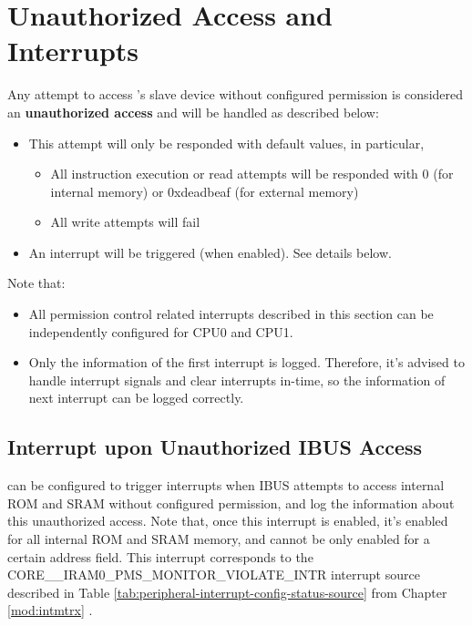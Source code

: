 \documentclass[main\_\_EN.tex]{subfiles}
\begin{document}
\section{Unauthorized Access and Interrupts}

Any attempt to access \chipname{}'s slave device without configured permission is considered an \textbf{unauthorized access} and will be handled as described below:
\begin{itemize}
    \item This attempt will only be responded with default values, in particular,
    \begin{itemize}
        \item All instruction execution or read attempts will be responded with 0 (for internal memory)  or 0x{}deadbeaf (for external memory)
        \item All write attempts will fail
    \end{itemize}
    \item An interrupt will be triggered (when enabled). See details below.
\end{itemize}

Note that:
\begin{itemize}
    \item All permission control related interrupts described in this section can be independently configured for CPU0 and CPU1.
    \item Only the information of the first interrupt is logged. Therefore, it's advised to handle interrupt signals and clear interrupts in-time, so the information of next interrupt can be logged correctly.
\end{itemize}

\subsection{Interrupt upon Unauthorized IBUS Access}



\chipname{} can be configured to trigger interrupts when IBUS attempts to access internal ROM and SRAM without configured permission, and log the information about this unauthorized access. Note that, once this interrupt is enabled, it's enabled for all internal ROM and SRAM memory, and cannot be only enabled for a certain address field. This interrupt corresponds to the CORE\_\_IRAM0\_PMS\_MONITOR\_VIOLATE\_INTR interrupt source described in Table \ref{tab:peripheral-interrupt-config-status-source} from Chapter \ref{mod:intmtrx} \textit{}.
\end{document}
